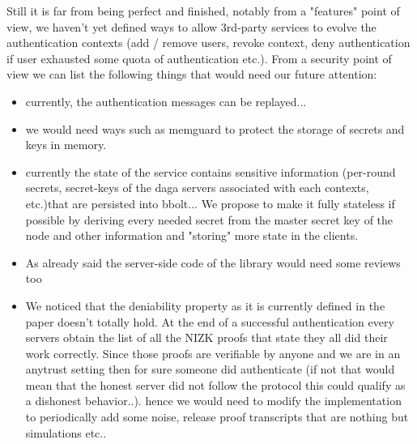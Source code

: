 \documentclass[nobib, a4paper]{tufte-book}
\begin{document}
    Still it is far from being perfect and finished, notably from a "features" point of view, we haven't yet defined ways
    to allow 3rd-party services to evolve the authentication contexts (add / remove users, revoke context, deny authentication if user exhausted some quota of authentication etc.).
    From a security point of view we can list the following things that would need our future attention:
    \begin{itemize}
        \item currently, the authentication messages can be replayed...
        \item we would need ways such as memguard to protect the storage of secrets and keys in memory.
        \item currently the state of the service contains sensitive information
            (per-round secrets, secret-keys of the daga servers associated with each contexts, etc.)that are persisted into bbolt...
            We propose to make it fully stateless if possible by deriving every needed secret from the master secret key
            of the node and other information and "storing" more state in the clients.
        \item As already said the server-side code of the library would need some reviews too
        \item We noticed that the deniability property as it is currently defined in the paper doesn't totally hold.
            At the end of a successful authentication every servers obtain the list of all the NIZK proofs that state they all did their work correctly.
            Since those proofs are verifiable by anyone and we are in an anytrust setting then for sure someone did authenticate (if not that would mean that
            the honest server did not follow the protocol this could qualify as a dishonest behavior..).
            hence we would need to modify the implementation to periodically add some noise, release proof transcripts that are nothing but simulations etc..
    \end{itemize}
\end{document}
